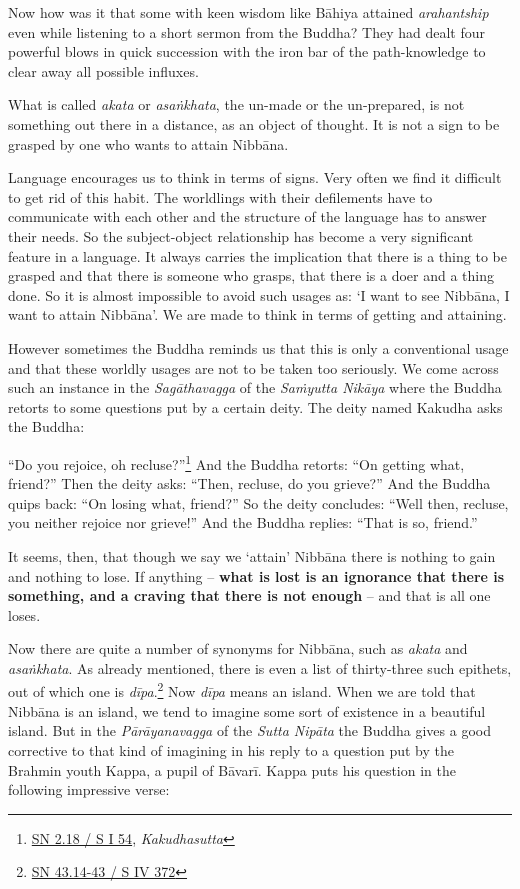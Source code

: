 Now how was it that some with keen wisdom like Bāhiya attained \emph{arahantship} even while listening to a short sermon from the Buddha? They had dealt four powerful blows in quick succession with the iron bar of the path-knowledge to clear away all possible influxes.

What is called \emph{akata} or \emph{asaṅkhata}, the un-made or the un-prepared, is not something out there in a distance, as an object of thought. It is not a sign to be grasped by one who wants to attain Nibbāna.

Language encourages us to think in terms of signs. Very often we find it difficult to get rid of this habit. The worldlings with their defilements have to communicate with each other and the structure of the language has to answer their needs. So the subject-object relationship has become a very significant feature in a language. It always carries the implication that there is a thing to be grasped and that there is someone who grasps, that there is a doer and a thing done. So it is almost impossible to avoid such usages as: `I want to see Nibbāna, I want to attain Nibbāna'. We are made to think in terms of getting and attaining.

However sometimes the Buddha reminds us that this is only a conventional usage and that these worldly usages are not to be taken too seriously. We come across such an instance in the \emph{Sagāthavagga} of the \emph{Saṁyutta Nikāya} where the Buddha retorts to some questions put by a certain deity. The deity named Kakudha asks the Buddha:

``Do you rejoice, oh recluse?''\footnote{\href{https://suttacentral.net/sn2.18/pli/ms}{SN 2.18 / S I 54}, \emph{Kakudhasutta}} And the Buddha retorts: ``On getting what, friend?'' Then the deity asks: ``Then, recluse, do you grieve?'' And the Buddha quips back: ``On losing what, friend?'' So the deity concludes: ``Well then, recluse, you neither rejoice nor grieve!'' And the Buddha replies: ``That is so, friend.''

It seems, then, that though we say we `attain' Nibbāna there is nothing to gain and nothing to lose. If anything -- \textbf{what is lost is an ignorance that there is something, and a craving that there is not enough} -- and that is all one loses.

Now there are quite a number of synonyms for Nibbāna, such as \emph{akata} and \emph{asaṅkhata}. As already mentioned, there is even a list of thirty-three such epithets, out of which one is \emph{dīpa}.\footnote{\href{https://suttacentral.net/sn43.14-43/pli/ms}{SN 43.14-43 / S IV 372}} Now \emph{dīpa} means an island. When we are told that Nibbāna is an island, we tend to imagine some sort of existence in a beautiful island. But in the \emph{Pārāyanavagga} of the \emph{Sutta Nipāta} the Buddha gives a good corrective to that kind of imagining in his reply to a question put by the Brahmin youth Kappa, a pupil of Bāvarī. Kappa puts his question in the following impressive verse:


